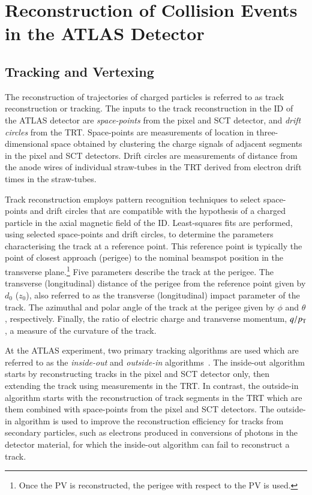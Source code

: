 \section{Reconstruction of Collision Events in the ATLAS Detector}%
\label{sec:object_reco_at_atlas}



\subsection{Tracking and Vertexing}

The reconstruction of trajectories of charged particles is referred to as track
reconstruction or tracking. The inputs to the track reconstruction in the ID of
the ATLAS detector are \emph{space-points} from the pixel and SCT detector, and
\emph{drift circles} from the TRT. Space-points are measurements of location in
three-dimensional space obtained by clustering the charge signals of adjacent
segments in the pixel and SCT detectors. Drift circles are measurements of
distance from the anode wires of individual straw-tubes in the TRT derived from
electron drift times in the straw-tubes.

Track reconstruction employs pattern recognition techniques to select
space-points and drift circles that are compatible with the hypothesis of a
charged particle in the axial magnetic field of the ID. Least-squares fits are
performed, using selected space-points and drift circles, to determine the
parameters characterising the track at a reference point. This reference point
is typically the point of closest approach (perigee) to the nominal beamspot
position in the transverse plane.\footnote{Once the PV is reconstructed, the
  perigee with respect to the PV is used.} Five parameters describe the track at
the perigee. The transverse (longitudinal) distance of the perigee from the
reference point given by $d_0$ ($z_0$), also referred to as the transverse
(longitudinal) impact parameter of the track. The azimuthal and polar angle of
the track at the perigee given by $\phi$ and $\theta$, respectively. Finally,
the ratio of electric charge and transverse momentum, $q / p_{\text{T}}$, a measure of
the curvature of the track.

At the ATLAS experiment, two primary tracking algorithms are used which are
referred to as the \emph{inside-out} and \emph{outside-in}
algorithms~\cite{Cornelissen:2007vba,Salzburger:2015sgq,PERF-2015-08}. The
inside-out algorithm starts by reconstructing tracks in the pixel and SCT
detector only, then extending the track using measurements in the TRT. In
contrast, the outside-in algorithm starts with the reconstruction of track
segments in the TRT which are them combined with space-points from the pixel and
SCT detectors. The outside-in algorithm is used to improve the reconstruction
efficiency for tracks from secondary particles, such as electrons produced in
conversions of photons in the detector material, for which the inside-out
algorithm can fail to reconstruct a track.

